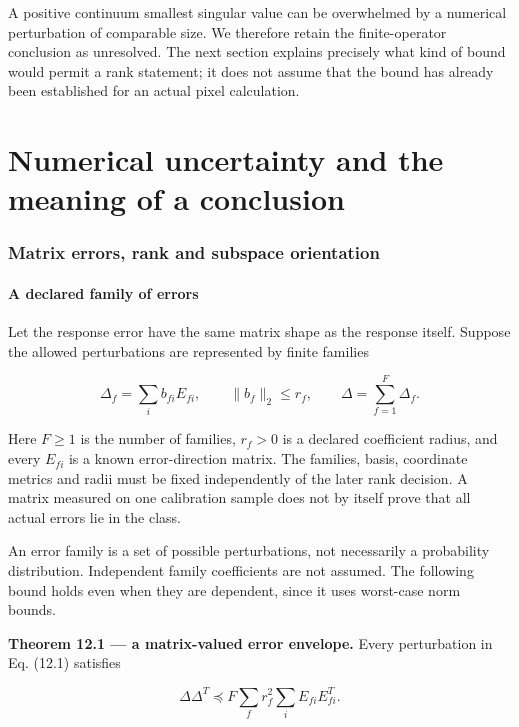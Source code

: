 \documentclass[
  11pt,
  a4paper]{article}
\begin{document}
A positive continuum smallest singular value can be overwhelmed by a numerical perturbation of comparable size. We therefore retain the finite-operator conclusion as unresolved. The next section explains precisely what kind of bound would permit a rank statement; it does not assume that the bound has already been established for an actual pixel calculation.

\clearpage
\part{Numerical uncertainty and the meaning of a conclusion}

\hypertarget{matrix-errors-rank-and-subspace-orientation}{%
\section{Matrix errors, rank and subspace orientation}\label{matrix-errors-rank-and-subspace-orientation}}

\hypertarget{a-declared-family-of-errors}{%
\subsection{A declared family of errors}\label{a-declared-family-of-errors}}

Let the response error have the same matrix shape as the response itself. Suppose the allowed perturbations are represented by finite families

\[
\Delta_f=\sum_i b_{fi}E_{fi},\qquad
\|b_f\|_2\le r_f,\qquad
\Delta=\sum_{f=1}^{F}\Delta_f.
\tag{12.1}
\]

Here \(F\ge1\) is the number of families, \(r_f>0\) is a declared coefficient radius, and every \(E_{fi}\) is a known error-direction matrix. The families, basis, coordinate metrics and radii must be fixed independently of the later rank decision. A matrix measured on one calibration sample does not by itself prove that all actual errors lie in the class.

An error family is a set of possible perturbations, not necessarily a probability distribution. Independent family coefficients are not assumed. The following bound holds even when they are dependent, since it uses worst-case norm bounds.

\textbf{Theorem 12.1 --- a matrix-valued error envelope.} Every perturbation in Eq. (12.1) satisfies

\[
\Delta\Delta^T\preceq F\sum_f r_f^2\sum_iE_{fi}E_{fi}^T.
\tag{12.2}
\]
\end{document}

